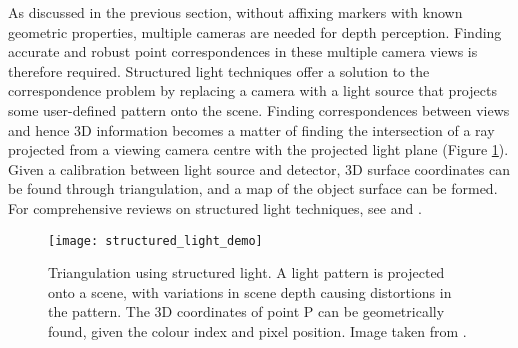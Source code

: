 \documentclass[class=article, crop=false]{standalone}
\begin{document}
As discussed in the previous section, without affixing markers with known geometric properties, multiple cameras are needed for depth perception. Finding accurate and robust point correspondences in these multiple camera views is therefore required. Structured light techniques offer a solution to the correspondence problem by replacing a camera with a light source that projects some user-defined pattern onto the scene. Finding correspondences between views and hence 3D information becomes a matter of finding the intersection of a ray projected from a viewing camera centre with the projected light plane (Figure \ref{struct_light}). Given a calibration between light source and detector, 3D surface coordinates can be found through triangulation, and a map of the object surface can be formed. For comprehensive reviews on structured light techniques, see \parencite{Geng2011} and \parencite{Salvi2010}.

\begin{figure}[!ht]
	\centering
	\texttt{[image: structured\_light\_demo]}
	\caption{Triangulation using structured light. A light pattern is projected onto a scene, with variations in scene depth causing distortions in the pattern. The 3D coordinates of point P can be geometrically found, given the colour index and pixel position. Image taken from \parencite{Geng2011}.}
	\label{struct_light}
\end{figure}
\end{document}
